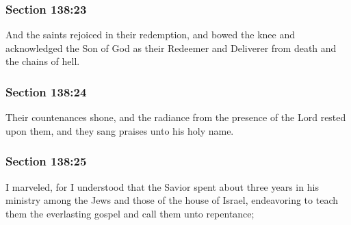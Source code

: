 	\subsubsection{Section 138:23} %
		\label{DC138-23}

		And the saints rejoiced in their redemption, and bowed the knee and acknowledged the Son of God as their Redeemer and Deliverer from death and the chains of hell.


	\subsubsection{Section 138:24} %
		\label{DC138-24}

		Their countenances shone, and the radiance from the presence of the Lord rested upon them, and they sang praises unto his holy name.


	\subsubsection{Section 138:25} %
		\label{DC138-25}

		I marveled, for I understood that the Savior spent about three years in his ministry among the Jews and those of the house of Israel, endeavoring to teach them the everlasting gospel and call them unto repentance;


